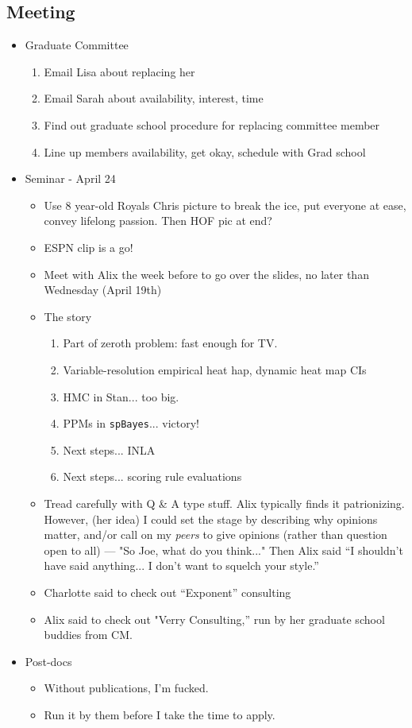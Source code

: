 \documentclass{article}
\begin{document}
\subsection*{Meeting}
\begin{itemize}
\item Graduate Committee
  \begin{enumerate}
  \item Email Lisa about replacing her
  \item Email Sarah about availability, interest, time
  \item Find out graduate school procedure for replacing committee member
  \item Line up members availability, get okay, schedule with Grad school
  \end{enumerate}
\item Seminar - April 24
  \begin{itemize}
  \item Use 8 year-old Royals Chris picture to break the ice, put everyone at ease, convey lifelong passion. Then HOF pic at end?
  \item ESPN clip is a go!
  \item Meet with Alix the week before to go over the slides, no later than Wednesday (April 19th)
  \item The story
    \begin{enumerate}
    \item Part of zeroth problem: fast enough for TV.
    \item Variable-resolution empirical heat hap, dynamic heat map CIs
    \item HMC in Stan... too big.
    \item PPMs in \verb|spBayes|... victory!
    \item Next steps... INLA
    \item Next steps... scoring rule evaluations
    \end{enumerate}
  \item Tread carefully with Q \& A type stuff. Alix typically finds it patrionizing. However, (her idea) I could set the stage by describing why opinions matter, and/or call on my {\it peers} to give opinions (rather than question open to all) --- "So Joe, what do you think..." Then Alix said ``I shouldn't have said anything... I don't want to squelch your style.''
  \item Charlotte said to check out ``Exponent'' consulting
  \item Alix said to check out "Verry Consulting,'' run by her graduate school buddies from CM.
  \end{itemize}
\item Post-docs
  \begin{itemize}
  \item Without publications, I'm fucked.
  \item Run it by them before I take the time to apply.
  \end{itemize}
\end{itemize}
\end{document}
